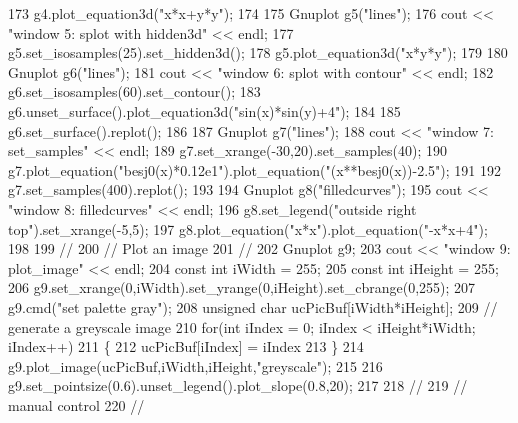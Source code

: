 \begin{DoxyCode}
173         g4.plot\_equation3d(\textcolor{stringliteral}{"x*x+y*y"});
174 
175         Gnuplot g5(\textcolor{stringliteral}{"lines"});
176         cout << \textcolor{stringliteral}{"window 5: splot with hidden3d"} << endl;
177         g5.set\_isosamples(25).set\_hidden3d();
178         g5.plot\_equation3d(\textcolor{stringliteral}{"x*y*y"});
179 
180         Gnuplot g6(\textcolor{stringliteral}{"lines"});
181         cout << \textcolor{stringliteral}{"window 6: splot with contour"} << endl;
182         g6.set\_isosamples(60).set\_contour();
183         g6.unset\_surface().plot\_equation3d(\textcolor{stringliteral}{"sin(x)*sin(y)+4"});
184 
185         g6.set\_surface().replot();
186 
187         Gnuplot g7(\textcolor{stringliteral}{"lines"});
188         cout << \textcolor{stringliteral}{"window 7: set\_samples"} << endl;
189         g7.set\_xrange(-30,20).set\_samples(40);
190         g7.plot\_equation(\textcolor{stringliteral}{"besj0(x)*0.12e1"}).plot\_equation(\textcolor{stringliteral}{"(x**besj0(x))-2.5"});
191 
192         g7.set\_samples(400).replot();
193 
194         Gnuplot g8(\textcolor{stringliteral}{"filledcurves"});
195         cout << \textcolor{stringliteral}{"window 8: filledcurves"} << endl;
196         g8.set\_legend(\textcolor{stringliteral}{"outside right top"}).set\_xrange(-5,5);
197         g8.plot\_equation(\textcolor{stringliteral}{"x*x"}).plot\_equation(\textcolor{stringliteral}{"-x*x+4"});
198 
199         \textcolor{comment}{//}
200         \textcolor{comment}{// Plot an image}
201         \textcolor{comment}{//}
202         Gnuplot g9;
203         cout << \textcolor{stringliteral}{"window 9: plot\_image"} << endl;
204         \textcolor{keyword}{const} \textcolor{keywordtype}{int} iWidth  = 255;
205         \textcolor{keyword}{const} \textcolor{keywordtype}{int} iHeight = 255;
206         g9.set_xrange(0,iWidth).set_yrange(0,iHeight).set_cbrange(0,255);
207         g9.cmd(\textcolor{stringliteral}{"set palette gray"});
208         \textcolor{keywordtype}{unsigned} \textcolor{keywordtype}{char} ucPicBuf[iWidth*iHeight];
209         \textcolor{comment}{// generate a greyscale image}
210         \textcolor{keywordflow}{for}(\textcolor{keywordtype}{int} iIndex = 0; iIndex < iHeight*iWidth; iIndex++)
211         \{
212             ucPicBuf[iIndex] = iIndex%
213         \}
214         g9.plot_image(ucPicBuf,iWidth,iHeight,\textcolor{stringliteral}{"greyscale"});
215 
216         g9.set_pointsize(0.6).unset_legend().plot_slope(0.8,20);
217 
218         \textcolor{comment}{//}
219         \textcolor{comment}{// manual control}
220         \textcolor{comment}{//}

\end{DoxyCode}

